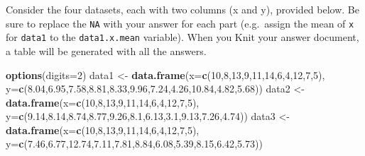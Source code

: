\documentclass[]{article}
\newenvironment{Shaded}{\begin{snugshade}}{\end{snugshade}}
\newcommand{\KeywordTok}[1]{\textcolor[rgb]{0.13,0.29,0.53}{\textbf{#1}}}
\newcommand{\DataTypeTok}[1]{\textcolor[rgb]{0.13,0.29,0.53}{#1}}
\newcommand{\DecValTok}[1]{\textcolor[rgb]{0.00,0.00,0.81}{#1}}
\newcommand{\FloatTok}[1]{\textcolor[rgb]{0.00,0.00,0.81}{#1}}
\newcommand{\StringTok}[1]{\textcolor[rgb]{0.31,0.60,0.02}{#1}}
\newcommand{\NormalTok}[1]{#1}
\begin{document}
Consider the four datasets, each with two columns (x and y), provided
below. Be sure to replace the \texttt{NA} with your answer for each part
(e.g.~assign the mean of \texttt{x} for \texttt{data1} to the
\texttt{data1.x.mean} variable). When you Knit your answer document, a
table will be generated with all the answers.

\begin{Shaded}
\begin{Highlighting}[]
\KeywordTok{options}\NormalTok{(}\DataTypeTok{digits=}\DecValTok{2}\NormalTok{)}
\NormalTok{data1 <-}\StringTok{ }\KeywordTok{data.frame}\NormalTok{(}\DataTypeTok{x=}\KeywordTok{c}\NormalTok{(}\DecValTok{10}\NormalTok{,}\DecValTok{8}\NormalTok{,}\DecValTok{13}\NormalTok{,}\DecValTok{9}\NormalTok{,}\DecValTok{11}\NormalTok{,}\DecValTok{14}\NormalTok{,}\DecValTok{6}\NormalTok{,}\DecValTok{4}\NormalTok{,}\DecValTok{12}\NormalTok{,}\DecValTok{7}\NormalTok{,}\DecValTok{5}\NormalTok{),}
                    \DataTypeTok{y=}\KeywordTok{c}\NormalTok{(}\FloatTok{8.04}\NormalTok{,}\FloatTok{6.95}\NormalTok{,}\FloatTok{7.58}\NormalTok{,}\FloatTok{8.81}\NormalTok{,}\FloatTok{8.33}\NormalTok{,}\FloatTok{9.96}\NormalTok{,}\FloatTok{7.24}\NormalTok{,}\FloatTok{4.26}\NormalTok{,}\FloatTok{10.84}\NormalTok{,}\FloatTok{4.82}\NormalTok{,}\FloatTok{5.68}\NormalTok{))}
\NormalTok{data2 <-}\StringTok{ }\KeywordTok{data.frame}\NormalTok{(}\DataTypeTok{x=}\KeywordTok{c}\NormalTok{(}\DecValTok{10}\NormalTok{,}\DecValTok{8}\NormalTok{,}\DecValTok{13}\NormalTok{,}\DecValTok{9}\NormalTok{,}\DecValTok{11}\NormalTok{,}\DecValTok{14}\NormalTok{,}\DecValTok{6}\NormalTok{,}\DecValTok{4}\NormalTok{,}\DecValTok{12}\NormalTok{,}\DecValTok{7}\NormalTok{,}\DecValTok{5}\NormalTok{),}
                    \DataTypeTok{y=}\KeywordTok{c}\NormalTok{(}\FloatTok{9.14}\NormalTok{,}\FloatTok{8.14}\NormalTok{,}\FloatTok{8.74}\NormalTok{,}\FloatTok{8.77}\NormalTok{,}\FloatTok{9.26}\NormalTok{,}\FloatTok{8.1}\NormalTok{,}\FloatTok{6.13}\NormalTok{,}\FloatTok{3.1}\NormalTok{,}\FloatTok{9.13}\NormalTok{,}\FloatTok{7.26}\NormalTok{,}\FloatTok{4.74}\NormalTok{))}
\NormalTok{data3 <-}\StringTok{ }\KeywordTok{data.frame}\NormalTok{(}\DataTypeTok{x=}\KeywordTok{c}\NormalTok{(}\DecValTok{10}\NormalTok{,}\DecValTok{8}\NormalTok{,}\DecValTok{13}\NormalTok{,}\DecValTok{9}\NormalTok{,}\DecValTok{11}\NormalTok{,}\DecValTok{14}\NormalTok{,}\DecValTok{6}\NormalTok{,}\DecValTok{4}\NormalTok{,}\DecValTok{12}\NormalTok{,}\DecValTok{7}\NormalTok{,}\DecValTok{5}\NormalTok{),}
                    \DataTypeTok{y=}\KeywordTok{c}\NormalTok{(}\FloatTok{7.46}\NormalTok{,}\FloatTok{6.77}\NormalTok{,}\FloatTok{12.74}\NormalTok{,}\FloatTok{7.11}\NormalTok{,}\FloatTok{7.81}\NormalTok{,}\FloatTok{8.84}\NormalTok{,}\FloatTok{6.08}\NormalTok{,}\FloatTok{5.39}\NormalTok{,}\FloatTok{8.15}\NormalTok{,}\FloatTok{6.42}\NormalTok{,}\FloatTok{5.73}\NormalTok{))}

\end{Highlighting}
\end{Shaded}
\end{document}

